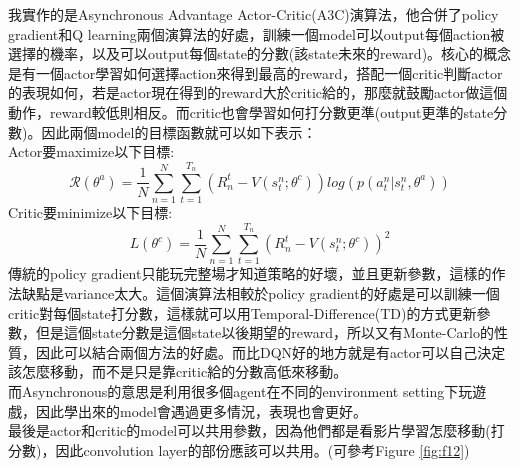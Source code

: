 \documentclass[12pt, a4paper]{article}
\begin{document}
\begin{CJK}{UTF8}{bkai}
我實作的是Asynchronous Advantage Actor-Critic(A3C)演算法，他合併了policy gradient和Q learning兩個演算法的好處，訓練一個model可以output每個action被選擇的機率，以及可以output每個state的分數(該state未來的reward)。核心的概念是有一個actor學習如何選擇action來得到最高的reward，搭配一個critic判斷actor的表現如何，若是actor現在得到的reward大於critic給的，那麼就鼓勵actor做這個動作，reward較低則相反。而critic也會學習如何打分數更準(output更準的state分數)。因此兩個model的目標函數就可以如下表示：\\
Actor要maximize以下目標:
\[\mathcal{R}(\theta^{a})=\frac{1}{N}\sum_{n=1}^N\sum_{t=1}^{T_n}(R_n^t - V(s_t^n; \theta^{c}))log(p(a_t^n|s_t^n, \theta^{a})) \]
Critic要minimize以下目標:
\[L(\theta^c) = \frac{1}{N}\sum_{n=1}^N\sum_{t=1}^{T_n}(R_n^t - V(s_t^n; \theta^{c}))^2 \]
傳統的policy gradient只能玩完整場才知道策略的好壞，並且更新參數，這樣的作法缺點是variance太大。這個演算法相較於policy gradient的好處是可以訓練一個critic對每個state打分數，這樣就可以用Temporal-Difference(TD)的方式更新參數，但是這個state分數是這個state以後期望的reward，所以又有Monte-Carlo的性質，因此可以結合兩個方法的好處。而比DQN好的地方就是有actor可以自己決定該怎麼移動，而不是只是靠critic給的分數高低來移動。\\
而Asynchronous的意思是利用很多個agent在不同的environment setting下玩遊戲，因此學出來的model會遇過更多情況，表現也會更好。\\
最後是actor和critic的model可以共用參數，因為他們都是看影片學習怎麼移動(打分數)，因此convolution layer的部份應該可以共用。(可參考Figure \ref{fig:f12})\\


\end{CJK}
\end{document}
